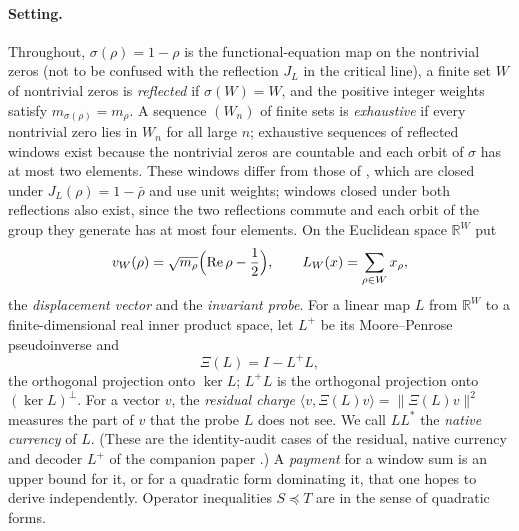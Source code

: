 \documentclass[11pt]{article}
\DeclareMathOperator{\Real}{Re}
\newcommand{\JL}{J_{L}}
\theoremstyle{definition}
\begin{document}
\paragraph{Setting.}
Throughout, \(\sigma(\rho)=1-\rho\) is the functional-equation map on
the nontrivial zeros (not to be confused with the reflection \(\JL\) in
the critical line), a finite set \(W\) of nontrivial
zeros is \emph{reflected} if \(\sigma(W)=W\), and the positive integer
weights satisfy \(m_{\sigma(\rho)}=m_\rho\).  A sequence \((W_n)\) of
finite sets is \emph{exhaustive} if every nontrivial zero lies in
\(W_n\) for all large \(n\); exhaustive sequences of reflected windows
exist because the nontrivial zeros are countable and each orbit of
\(\sigma\) has at most two elements.  These windows differ from those of
, which are closed under
\(\JL(\rho)=1-\bar\rho\) and use unit weights; windows closed under both
reflections also exist, since the two reflections commute and each
orbit of the group they generate has at most four elements.  On the Euclidean
space \(\mathbb R^W\) put
\[
  v_W(\rho)=\sqrt{m_\rho}\Bigl(\Real\rho-\frac12\Bigr),
  \qquad
  L_W(x)=\sum_{\rho\in W}x_\rho ,
\]
the \emph{displacement vector} and the \emph{invariant probe}.  For a linear map \(L\) from \(\mathbb R^W\) to a finite-dimensional
real inner product space, let \(L^+\) be its Moore--Penrose pseudoinverse and
\[
  \Xi(L)=I-L^+L ,
\]
the orthogonal projection onto \(\ker L\); \(L^+L\) is the orthogonal
projection onto \((\ker L)^\perp\).  For a vector \(v\), the
\emph{residual charge} \(\langle v,\Xi(L)v\rangle=\|\Xi(L)v\|^2\) measures
the part of \(v\) that the probe \(L\) does not see.  We call \(LL^*\) the \emph{native currency} of \(L\).  (These are the
identity-audit cases of the residual, native currency and decoder
\(L^+\) of the companion paper \citep{TsiokosXiCompanion2026}.)  A \emph{payment} for a window sum is an upper bound for it,
or for a quadratic form dominating it, that one hopes to derive
independently.  Operator inequalities \(S\preceq T\) are in the sense of
quadratic forms.
\end{document}

